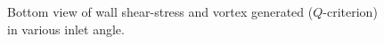 \begin{figure}
    \centering
    \noindent{}
    \caption{Bottom view of wall shear-stress and vortex generated ($Q$-criterion) in various inlet angle.}
    \label{fig:3D_OF_BOTTOM_VIEW_COMPARE_DIFF_IN}
\end{figure}